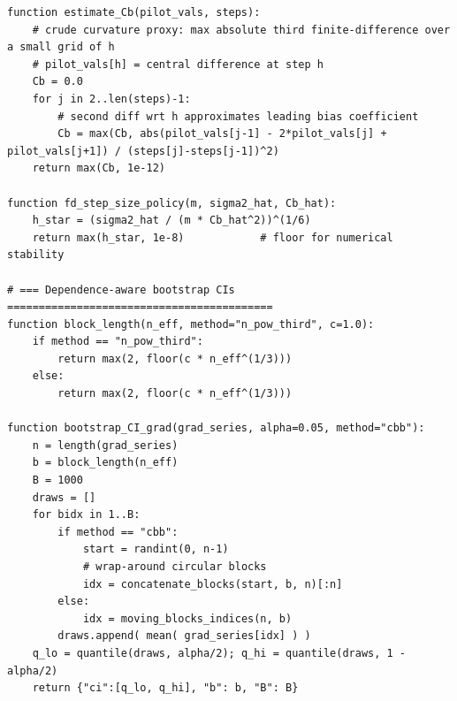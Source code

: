 \begin{lstlisting}
function estimate_Cb(pilot_vals, steps):
    # crude curvature proxy: max absolute third finite-difference over a small grid of h
    # pilot_vals[h] = central difference at step h
    Cb = 0.0
    for j in 2..len(steps)-1:
        # second diff wrt h approximates leading bias coefficient
        Cb = max(Cb, abs(pilot_vals[j-1] - 2*pilot_vals[j] + pilot_vals[j+1]) / (steps[j]-steps[j-1])^2)
    return max(Cb, 1e-12)

function fd_step_size_policy(m, sigma2_hat, Cb_hat):
    h_star = (sigma2_hat / (m * Cb_hat^2))^(1/6)
    return max(h_star, 1e-8)            # floor for numerical stability

# === Dependence-aware bootstrap CIs ==========================================
function block_length(n_eff, method="n_pow_third", c=1.0):
    if method == "n_pow_third":
        return max(2, floor(c * n_eff^(1/3)))
    else:
        return max(2, floor(c * n_eff^(1/3)))

function bootstrap_CI_grad(grad_series, alpha=0.05, method="cbb"):
    n = length(grad_series)
    b = block_length(n_eff)
    B = 1000
    draws = []
    for bidx in 1..B:
        if method == "cbb":
            start = randint(0, n-1)
            # wrap-around circular blocks
            idx = concatenate_blocks(start, b, n)[:n]
        else:
            idx = moving_blocks_indices(n, b)
        draws.append( mean( grad_series[idx] ) )
    q_lo = quantile(draws, alpha/2); q_hi = quantile(draws, 1 - alpha/2)
    return {"ci":[q_lo, q_hi], "b": b, "B": B}


\end{lstlisting}
